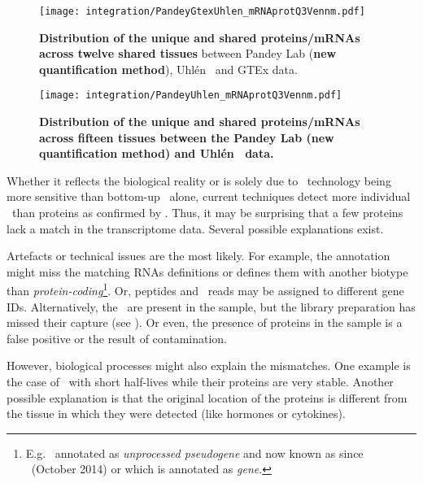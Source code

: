 \begin{figure}[!htpb]
    \texttt{[image: integration/PandeyGtexUhlen\_mRNAprotQ3Vennm.pdf]}\centering
    \caption[Distribution of the unique and shared proteins/mRNAs
    across the three datasets and twelve tissues
    (new protein quantification method)]{\label{fig:PGU_venQ3}%
    \textbf{Distribution of the unique and shared proteins/mRNAs
    across twelve shared tissues} between  Pandey Lab
    (\textbf{new quantification method}),
    Uhlén \etal\ and GTEx data.}
\end{figure}

\begin{figure}[!htpb]
    \texttt{[image: integration/PandeyUhlen\_mRNAprotQ3Vennm.pdf]}\centering
    \caption[Distribution of the unique and shared proteins/mRNAs
    ahlcross fifteen tissues between Pandey Lab (new quantification method)
    and Uhlén \textit{et al.} data]{\label{fig:PU_vennQ3}\textbf{Distribution of the
    unique and shared proteins/mRNAs across fifteen tissues between
    the Pandey Lab (new quantification method)
    and Uhlén \etal\ data.}}
\end{figure}

Whether it reflects the biological reality or
is solely due to \Rnaseq\ technology being more sensitive than
bottom-up \ms\ alone,
current techniques detect more individual \mRNAs\ than proteins
as confirmed by .
Thus, it may be surprising that
a few proteins lack a match in the transcriptome data.
Several possible explanations exist.\mybr\

Artefacts or technical issues are the most likely.
For example, the annotation might miss
the matching \glspl{RNA} definitions
or defines them with another biotype than \emph{protein-coding}\footnote{%
E.g.\  annotated as \textit{unprocessed pseudogene}
and now known as  since ~(October 2014) or
 which is annotated as  \textit{gene}.%
}.
Or, peptides and \mRNA\ reads may be assigned to different gene IDs.
Alternatively, the \mRNAs\ are present in the sample,
but the library preparation has missed their capture
(see ).
Or even, the presence of proteins in the sample is a false positive
or the result of contamination.\mybr\

However, biological processes might also explain the mismatches.
One example is the case of \mRNAs\ with short half-lives
while their proteins are very stable.
Another possible explanation is that
the original location of the proteins is different
from the tissue in which they were detected
(like hormones or cytokines).\mybr\

